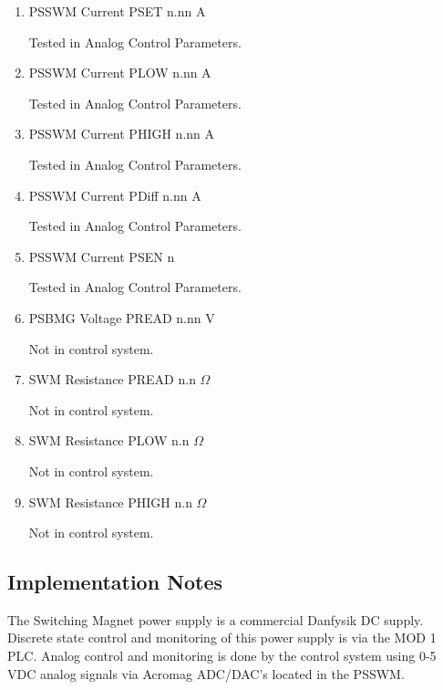 \documentclass[11pt]{book}		%
\begin{document}
\begin{enumerate}
 \item PSSWM Current PSET  n.nn A

\color{red}
Tested in Analog Control Parameters.
\color{black}

 \item PSSWM Current PLOW  n.nn A

\color{red}
Tested in Analog Control Parameters.
\color{black}

 \item PSSWM Current PHIGH n.nn A

\color{red}
Tested in Analog Control Parameters.
\color{black}

 \item PSSWM Current PDiff n.nn A

\color{red}
Tested in Analog Control Parameters.
\color{black}

 \item PSSWM Current PSEN  n

\color{red}
Tested in Analog Control Parameters.
\color{black}

 \item PSBMG Voltage PREAD n.nn V

\color{red}
Not in control system.
\color{black}

 \item SWM Resistance PREAD n.n $\Omega$

\color{red}
Not in control system.
\color{black}

 \item SWM Resistance PLOW n.n $\Omega$

\color{red}
Not in control system.
\color{black}

 \item SWM Resistance PHIGH n.n $\Omega$

\color{red}
Not in control system.
\color{black}

\end{enumerate}

\subsection{Implementation Notes}

The Switching Magnet power supply is a commercial Danfysik DC supply.  Discrete state control and monitoring of this power supply is via the MOD 1 PLC.  Analog control and monitoring is done by the control system using 0-5 VDC analog signals via Acromag ADC/DAC's located in the PSSWM.
\end{document}
